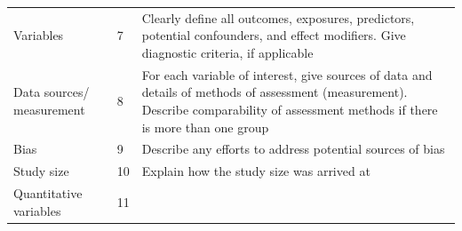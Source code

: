 \documentclass[]{book}
\begin{document}
\begin{longtable}[]{@{}lll@{}}
\begin{minipage}[t]{0.34\columnwidth}
Variables\strut
\end{minipage} & \begin{minipage}[t]{0.17\columnwidth}\raggedright
7\strut
\end{minipage} & \begin{minipage}[t]{0.40\columnwidth}\raggedright
Clearly define all outcomes,
exposures, predictors,
potential confounders, and
effect modifiers. Give
diagnostic criteria, if
applicable\strut
\end{minipage}\tabularnewline
\begin{minipage}[t]{0.34\columnwidth}\raggedright
Data sources/ measurement\strut
\end{minipage} & \begin{minipage}[t]{0.17\columnwidth}\raggedright
8\strut
\end{minipage} & \begin{minipage}[t]{0.40\columnwidth}\raggedright
For each variable of interest,
give sources of data and
details of methods of
assessment (measurement).
Describe comparability of
assessment methods if there is
more than one group\strut
\end{minipage}\tabularnewline
\begin{minipage}[t]{0.34\columnwidth}\raggedright
Bias\strut
\end{minipage} & \begin{minipage}[t]{0.17\columnwidth}\raggedright
9\strut
\end{minipage} & \begin{minipage}[t]{0.40\columnwidth}\raggedright
Describe any efforts to
address potential sources of
bias\strut
\end{minipage}\tabularnewline
\begin{minipage}[t]{0.34\columnwidth}\raggedright
Study size\strut
\end{minipage} & \begin{minipage}[t]{0.17\columnwidth}\raggedright
10\strut
\end{minipage} & \begin{minipage}[t]{0.40\columnwidth}\raggedright
Explain how the study size was
arrived at\strut
\end{minipage}\tabularnewline
\begin{minipage}[t]{0.34\columnwidth}\raggedright
Quantitative variables\strut
\end{minipage} & \begin{minipage}[t]{0.17\columnwidth}\raggedright
11\strut
\end{minipage} & \begin{minipage}[t]{0.40\columnwidth}\raggedright

\end{minipage}
\end{longtable}
\end{document}
